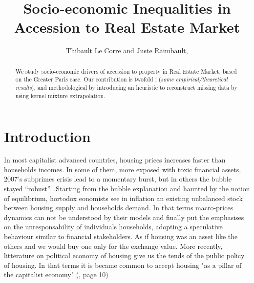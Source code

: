 

\title{
Socio-economic Inequalities in Accession to Real Estate Market
}

\author{Thibault Le Corre and Juste Raimbault,}




\begin{abstract}
We study socio-economic drivers of accession to property in Real Estate Market, based on the Greater Paris case. Our contribution is twofold : (\textit{some empirical/theoretical results}), and methodological by introducing an heuristic to reconstruct missing data by using kernel mixture extrapolation.
\end{abstract}


\maketitle







\section{Introduction}

In most capitalist advanced countries, housing prices increases faster than households incomes. In some of them, more exposed with toxic financial assets, 2007's subprimes crisis lead to a momentary burst, but in others the bubble stayed ``robust''~\cite{timbeau2013bulles}.Starting from the bubble explanation and haunted by the notion of equilibrium, hortodox eonomists see in inflation an existing unbalanced stock between housing supply and households demand. In that terms macro-prices dynamics can not be understood by their models and finally put the emphasises on the unresponsability of individuals households, adopting a speculative behaviour similar to financial stakeholders. As if housing was an asset like the others and we would buy one only for the exchange value.
More recently, litterature on political economy of housing give us the tends of the public policy of housing. In that terms it is became common to accept housing "as a pillar of the capitalist economy" (\cite{aalbers2016financialization}, page 10)

